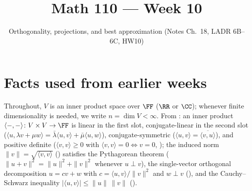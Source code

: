 \documentclass[10pt]{scrartcl}
\title{Math 110 --- Week 10}
\subtitle{Orthogonality, projections, and best approximation (Notes Ch.~18, LADR 6B--6C, HW10)}
\author{}\date{}\ihead{}
\newcommand{\ip}[2]{\langle #1,#2\rangle}
\begin{document}
\maketitle

\section{Facts used from earlier weeks}
Throughout, $V$ is an inner product space over $\FF$ ($\RR$ or $\CC$); whenever finite dimensionality is needed, we write $n=\dim V<\infty$. From : an inner product $\ip--\colon V\times V\to\FF$ is linear in the first slot, conjugate-linear in the second slot ($\ip u{\lambda v+\mu w}=\bar\lambda\ip uv+\bar\mu\ip uw$), conjugate-symmetric ($\ip uv=\overline{\ip vu}$), and positive definite ($\ip vv\ge 0$ with $\ip vv=0\iff v=0$, ); the induced norm $\|v\|=\sqrt{\ip vv}$ () satisfies the Pythagorean theorem ($\|u+v\|^2=\|u\|^2+\|v\|^2$ whenever $u\perp v$), the single-vector orthogonal decomposition $u=cv+w$ with $c=\ip uv/\|v\|^2$ and $w\perp v$ (), and the Cauchy--Schwarz inequality $|\ip uv|\le\|u\|\,\|v\|$ ().
\end{document}
